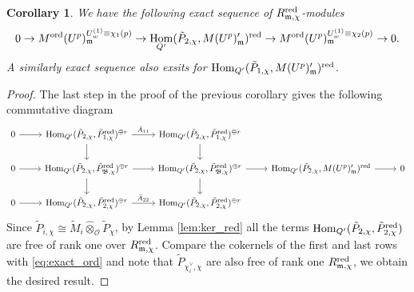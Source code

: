 \documentclass[leqno]{amsart}
\newcommand{\B}{\mathfrak B}
\newcommand{\red}{\textnormal{red}}
\newcommand{\ord}{\textnormal{ord}}
\newcommand{\oo}{\mathcal{O}} %
\newcommand{\fm}{\mathfrak{m}}
\DeclareMathOperator{\Hom}{Hom}
\newtheorem{cor}[thm]{Corollary}
\theoremstyle{definition}
\theoremstyle{remark}
\begin{document}
\begin{cor}\label{cor:fil_by_ord}
	We have the following exact sequence of
	$R_{\fm,\chi}^{\red}$-modules
\begin{equation}
	0\to M^{\ord}(U^p)_{\fm}^{U_{w}^{(1)}\equiv \chi_1(p)}\to
	\Hom_{Q'}(\tilde{P}_{2,\chi},M(U^p)_{\fm}')^{\red}\to
	M^{\ord}(U^p)_{\fm}^{U_{w}^{(1)}\equiv \chi_2(p)}\to0.
\end{equation}
A similarly exact sequence also exsits
for $\Hom_{Q'}(\tilde{P}_{1,\chi},M(U^p)_{\fm}')^{\red}$.
\end{cor}
\begin{proof}
	The last step in the proof of the previous corollary
	gives the following commutative diagram
\begin{equation*}
    \begin{tikzcd}
	    0 \arrow[r]& 
	    \Hom_{Q'}(\tilde{P}_{2,\chi},\tilde{P}_{1,\chi}^{\red})^{\oplus r}
	    \arrow[r,"\bar{A}_{11}"] \arrow[d]&
	    \Hom_{Q'}(\tilde{P}_{2,\chi}, \tilde{P}_{1,\chi}^{\red})^{\oplus r}
	    \arrow[d] &&\\
	    0\arrow[r] & 
	    \Hom_{Q'}(\tilde{P}_{2,\chi},\tilde{P}_{\B,\chi}^{\red})^{\oplus r}
	    \arrow[r] \arrow[d] &
	    \Hom_{Q'}(\tilde{P}_{2,\chi}, \tilde{P}_{\B,\chi}^{\red})^{\oplus r}
	    \arrow[d] \arrow[r]&
	    \Hom_{Q'}(\tilde{P}_{2,\chi}, M(U^p)_{\fm}')^{\red}\arrow[r]&0\\
	    0\arrow[r] & 
	    \Hom_{Q'}(\tilde{P}_{2,\chi}, \tilde{P}_{2,\chi}^{\red})^{\oplus r}
	    \arrow[r,"\bar{A}_{22}"] &
	    \Hom_{Q'}(\tilde{P}_{2,\chi},\tilde{P}_{2,\chi}^{\red})^{\oplus r}&&
    \end{tikzcd}
\end{equation*}
Since $\tilde{P}_{i,\chi}\cong \tilde{M}_i\hat{\otimes}_{\oo}\tilde{P}_{\chi}$,
by Lemma \ref{lem:ker_red}
all the terms 
$\Hom_{Q'}(\tilde{P}_{2,\chi},\tilde{P}_{2,\chi}^{\red})$
are free of rank one over  $R_{\fm,\chi}^{\red}$.
Compare the cokernels of the first and last rows
with \eqref{eq:exact_ord}
and note that $\tilde{P}_{\chi_i^\vee,\chi}$
are also free of rank one $R_{\fm,\chi}^{\red}$,
we obtain the desired result.
\end{proof}  
\end{document}
